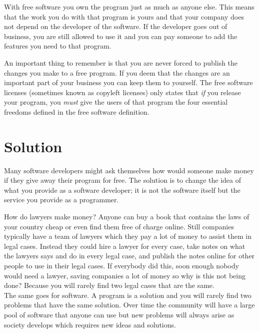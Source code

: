 \documentclass[12pt,a4paper]{article}
\begin{document}
With free software you own the program just as much as anyone else. This means that the work you do with that program is yours and that your company does not depend on the developer of the software. If the developer goes out of business, you are still allowed to use it and you can pay someone to add the features you need to that program.

An important thing to remember is that you are never forced to publish the changes you make to a free program. If you deem that the changes are an important part of your business you can keep them to yourself. The free software licenses (sometimes known as copyleft licenses) only states that \textit{if} you release your program, you \textit{must} give the users of that program the four essential freedoms defined in the free software definition.

\section{Solution}
Many software developers might ask themselves how would someone make money if they give away their program for free. The solution is to change the idea of what you provide as a software developer; it is not the software itself but the service you provide as a programmer.

How do lawyers make money? Anyone can buy a book that contains the laws of your country cheap or even find them free of charge online. Still companies typically have a team of lawyers which they pay a lot of money to assist them in legal cases. Instead they could hire a lawyer for every case, take notes on what the lawyers says and do in every legal case, and publish the notes online for other people to use in their legal cases. If everybody did this, soon enough nobody would need a lawyer, saving companies a lot of money so why is this not being done? Because you will rarely find two legal cases that are the same.\\
The same goes for software. A program is a solution and you will rarely find two problems that have the same solution. Over time the community will have a large pool of software that anyone can use but new problems will always arise as society develops which requires new ideas and solutions.
\newpage
\appendix
\end{document}
